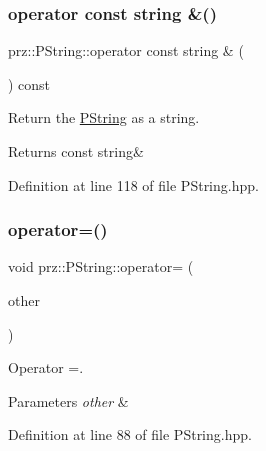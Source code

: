 \subsubsection{\texorpdfstring{operator const string \&()}{operator const string \&()}}
{\footnotesize\ttfamily prz\+::\+P\+String\+::operator const string \& (\begin{DoxyParamCaption}{ }\end{DoxyParamCaption}) const\hspace{0.3cm}{\ttfamily [inline]}}



Return the \mbox{\hyperlink{classprz_1_1_p_string}{P\+String}} as a string. 

\begin{DoxyReturn}{Returns}
const string\& 
\end{DoxyReturn}


Definition at line 118 of file P\+String.\+hpp.

\mbox{\label{classprz_1_1_p_string_af11c712191376d1a520d9f6fec1043f1}} 
\subsubsection{\texorpdfstring{operator=()}{operator=()}\hspace{0.1cm}{\footnotesize\ttfamily [1/3]}}
{\footnotesize\ttfamily void prz\+::\+P\+String\+::operator= (\begin{DoxyParamCaption}\item[{const \mbox{\hyperlink{classprz_1_1_p_string}{P\+String}} \&}]{other }\end{DoxyParamCaption})\hspace{0.3cm}{\ttfamily [inline]}}



Operator =. 


\begin{DoxyParams}{Parameters}
{\em other} & \\
\hline
\end{DoxyParams}


Definition at line 88 of file P\+String.\+hpp.

